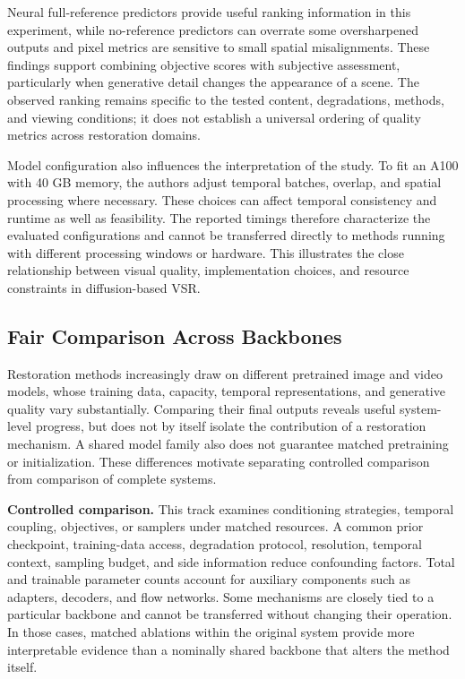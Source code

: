 Neural full-reference predictors provide useful ranking information in this experiment, while no-reference predictors can overrate some oversharpened outputs and pixel metrics are sensitive to small spatial misalignments. These findings support combining objective scores with subjective assessment, particularly when generative detail changes the appearance of a scene. The observed ranking remains specific to the tested content, degradations, methods, and viewing conditions; it does not establish a universal ordering of quality metrics across restoration domains.

Model configuration also influences the interpretation of the study. To fit an A100 with 40 GB memory, the authors adjust temporal batches, overlap, and spatial processing where necessary. These choices can affect temporal consistency and runtime as well as feasibility. The reported timings therefore characterize the evaluated configurations and cannot be transferred directly to methods running with different processing windows or hardware. This illustrates the close relationship between visual quality, implementation choices, and resource constraints in diffusion-based VSR.

\subsection{Fair Comparison Across Backbones}
Restoration methods increasingly draw on different pretrained image and video models, whose training data, capacity, temporal representations, and generative quality vary substantially. Comparing their final outputs reveals useful system-level progress, but does not by itself isolate the contribution of a restoration mechanism. A shared model family also does not guarantee matched pretraining or initialization. These differences motivate separating controlled comparison from comparison of complete systems.

\textbf{Controlled comparison.} This track examines conditioning strategies, temporal coupling, objectives, or samplers under matched resources. A common prior checkpoint, training-data access, degradation protocol, resolution, temporal context, sampling budget, and side information reduce confounding factors. Total and trainable parameter counts account for auxiliary components such as adapters, decoders, and flow networks. Some mechanisms are closely tied to a particular backbone and cannot be transferred without changing their operation. In those cases, matched ablations within the original system provide more interpretable evidence than a nominally shared backbone that alters the method itself.

